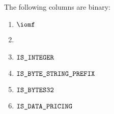 The following columns are binary:
\begin{multicols}{3}
	\begin{enumerate}
		\item $\iomf$
		\item[\vspace{\fill}]
		\item $\texttt{IS\_INTEGER}$
		\item $\texttt{IS\_BYTE\_STRING\_PREFIX}$
		\item $\texttt{IS\_BYTES32}$
		\item $\texttt{IS\_DATA\_PRICING}$
	\end{enumerate}
\end{multicols}
